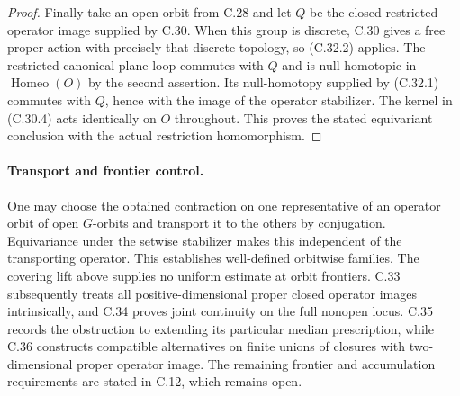 \begin{proof}
Finally take an open orbit from C.28 and let $Q$ be the closed
restricted operator image supplied by C.30. When this group is
discrete, C.30 gives a free proper action with precisely that
discrete topology, so (C.32.2) applies. The restricted canonical
plane loop commutes with $Q$ and is null-homotopic in
$\operatorname{Homeo}(O)$ by the second assertion. Its
null-homotopy supplied by (C.32.1) commutes with $Q$, hence with
the image of the operator stabilizer. The kernel in (C.30.4)
acts identically on $O$ throughout. This proves the stated
equivariant conclusion with the actual restriction homomorphism.
\end{proof}

\paragraph{Transport and frontier control.}
One may choose the obtained contraction on one representative of
an operator orbit of open $G$-orbits and transport it to the others
by conjugation. Equivariance under the setwise stabilizer makes
this independent of the transporting operator. This establishes
well-defined orbitwise families. The covering lift above supplies
no uniform estimate at orbit frontiers. C.33 subsequently treats
all positive-dimensional proper closed operator images
intrinsically, and C.34 proves joint continuity on the full
nonopen locus. C.35 records the obstruction to extending its
particular median prescription, while C.36 constructs compatible
alternatives on finite unions of closures with two-dimensional
proper operator image. The remaining frontier and accumulation
requirements are stated in C.12, which remains open.

